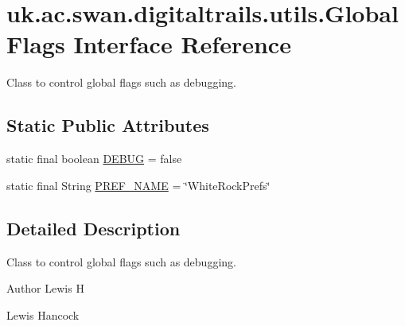\hypertarget{interfaceuk_1_1ac_1_1swan_1_1digitaltrails_1_1utils_1_1_global_flags}{\section{uk.\+ac.\+swan.\+digitaltrails.\+utils.\+Global\+Flags Interface Reference}
\label{interfaceuk_1_1ac_1_1swan_1_1digitaltrails_1_1utils_1_1_global_flags}
}


Class to control global flags such as debugging.  


\subsection*{Static Public Attributes}
\begin{DoxyCompactItemize}
\item 
static final boolean \hyperlink{interfaceuk_1_1ac_1_1swan_1_1digitaltrails_1_1utils_1_1_global_flags_ab66530eac1afabd42e6dfa7819cba196}{D\+E\+B\+U\+G} = false
\item 
static final String \hyperlink{interfaceuk_1_1ac_1_1swan_1_1digitaltrails_1_1utils_1_1_global_flags_a95ec83059f5234100d715662a0c79ba8}{P\+R\+E\+F\+\_\+\+N\+A\+M\+E} = \char`\"{}White\+Rock\+Prefs\char`\"{}
\end{DoxyCompactItemize}


\subsection{Detailed Description}
Class to control global flags such as debugging. 

\begin{DoxyAuthor}{Author}
Lewis H 

Lewis Hancock 
\end{DoxyAuthor}


